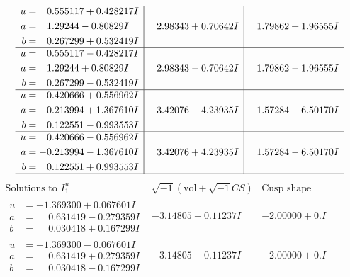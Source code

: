 \documentclass[1p]{elsarticle_modified}
\theoremstyle{definition}
\newcommand{\I}{\sqrt{-1}}
\begin{document}
$$\begin{array}{c|c|c}
\begin{aligned}
u &= \phantom{-}0.555117 + 0.428217 I \\
a &= \phantom{-}1.29244 - 0.80829 I \\
b &= \phantom{-}0.267299 + 0.532419 I\end{aligned}
 & \phantom{-}2.98343 + 0.70642 I & \phantom{-}1.79862 + 1.96555 I \\ \hline\begin{aligned}
u &= \phantom{-}0.555117 - 0.428217 I \\
a &= \phantom{-}1.29244 + 0.80829 I \\
b &= \phantom{-}0.267299 - 0.532419 I\end{aligned}
 & \phantom{-}2.98343 - 0.70642 I & \phantom{-}1.79862 - 1.96555 I \\ \hline\begin{aligned}
u &= \phantom{-}0.420666 + 0.556962 I \\
a &= -0.213994 + 1.367610 I \\
b &= \phantom{-}0.122551 - 0.993553 I\end{aligned}
 & \phantom{-}3.42076 - 4.23935 I & \phantom{-}1.57284 + 6.50170 I \\ \hline\begin{aligned}
u &= \phantom{-}0.420666 - 0.556962 I \\
a &= -0.213994 - 1.367610 I \\
b &= \phantom{-}0.122551 + 0.993553 I\end{aligned}
 & \phantom{-}3.42076 + 4.23935 I & \phantom{-}1.57284 - 6.50170 I\\
 \hline 
 \end{array}$$\newpage$$\begin{array}{c|c|c}  
\text{Solutions to }I^u_{1}& \I (\text{vol} + \sqrt{-1}CS) & \text{Cusp shape}\\
 \hline 
\begin{aligned}
u &= -1.369300 + 0.067601 I \\
a &= \phantom{-}0.631419 - 0.279359 I \\
b &= \phantom{-}0.030418 + 0.167299 I\end{aligned}
 & -3.14805 + 0.11237 I & -2.00000 + 0. I\phantom{ +0.000000I} \\ \hline\begin{aligned}
u &= -1.369300 - 0.067601 I \\
a &= \phantom{-}0.631419 + 0.279359 I \\
b &= \phantom{-}0.030418 - 0.167299 I\end{aligned}
 & -3.14805 - 0.11237 I & -2.00000 + 0. I\phantom{ +0.000000I} \\ \hline\begin{aligned}

\end{aligned}
\end{array}$$
\end{document}
